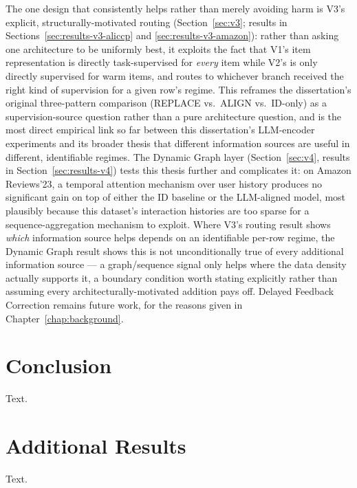 \documentclass{uclthesis}
\begin{document}
The one design that consistently helps rather than merely avoiding harm is V3's explicit, structurally-motivated routing (Section~\ref{sec:v3}; results in Sections~\ref{sec:results-v3-aliccp} and \ref{sec:results-v3-amazon}): rather than asking one architecture to be uniformly best, it exploits the fact that V1's item representation is directly task-supervised for \emph{every} item while V2's is only directly supervised for warm items, and routes to whichever branch received the right kind of supervision for a given row's regime. This reframes the dissertation's original three-pattern comparison (REPLACE vs.\ ALIGN vs.\ ID-only) as a supervision-source question rather than a pure architecture question, and is the most direct empirical link so far between this dissertation's LLM-encoder experiments and its broader thesis that different information sources are useful in different, identifiable regimes. The Dynamic Graph layer (Section~\ref{sec:v4}, results in Section~\ref{sec:results-v4}) tests this thesis further and complicates it: on Amazon Reviews'23, a temporal attention mechanism over user history produces no significant gain on top of either the ID baseline or the LLM-aligned model, most plausibly because this dataset's interaction histories are too sparse for a sequence-aggregation mechanism to exploit. Where V3's routing result shows \emph{which} information source helps depends on an identifiable per-row regime, the Dynamic Graph result shows this is not unconditionally true of every additional information source --- a graph/sequence signal only helps where the data density actually supports it, a boundary condition worth stating explicitly rather than assuming every architecturally-motivated addition pays off. Delayed Feedback Correction remains future work, for the reasons given in Chapter~\ref{chap:background}.

\chapter{Conclusion}
Text.
% 


\appendix
\chapter{Additional Results}
Text.
\end{document}
